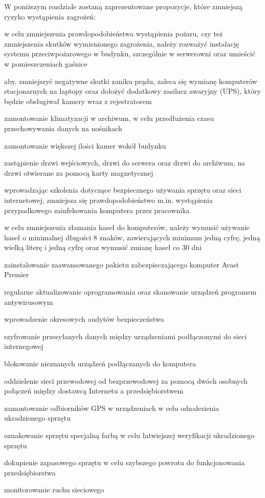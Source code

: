 W poniższym rozdziale zostaną zaprezentowane propozycje, które zmniejszą ryzyko wystąpienia zagrożeń:
\begin{itemize*}
	\item w celu zmniejszenia prawdopodobieństwa wystąpienia pożaru, czy też zmniejszenia skutków wymienionego zagrożenia, należy rozważyć instalację systemu przeciwpożarowego w budynku, szczególnie w serwerowni oraz umieścić w pomieszczeniach gaśnice
	\item aby, zmniejszyć negatywne skutki zaniku prądu, zaleca się wymianę komputerów stacjonarnych na laptopy oraz dołożyć dodatkowy zasilacz awaryjny (UPS), który będzie obsługiwał kamery wraz z rejestratorem
	\item zamontowanie klimatyzacji w archiwum, w celu przedłużenia czasu przechowywania danych na nośnikach
	\item zamontowanie większej ilości kamer wokół budynku
	\item zastąpienie drzwi wejściowych, drzwi do serwera oraz drzwi do archiwum, na drzwi otwierane za pomocą karty magnetycznej
	\item wprowadzając szkolenia dotyczące bezpiecznego używania sprzętu oraz sieci internetowej, zmniejsza się prawdopodobieństwo m.in. wystąpienia przypadkowego zainfekowania komputera przez pracownika
	\item w celu zmniejszenia złamania haseł do komputerów, należy wymusić używanie haseł o minimalnej długości 8 znaków, zawierających minimum jedną cyfrę, jedną wielką literę i jedną cyfrę oraz wymusić zmianę haseł co 30 dni
	\item zainstalowanie zaawansowanego pakietu zabezpieczającego komputer Avast Premier
	\item regularne aktualizowanie oprogramowania oraz skanowanie urządzeń programem antywirusowym
	\item wprowadzenie okresowych audytów bezpieczeństwa
	\item szyfrowanie przesyłanych danych między urządzeniami podłączonymi do sieci internegowej
	\item blokowanie nieznanych urządzeń podłączanych do komputera
	\item oddzielenie sieci przewodowej od bezprzewodowej za pomocą dwóch osobnych połączeń między dostawcą Internetu a przedsiębiorstwem
	\item zamontowanie odbiorników GPS w urządzeniach w celu odnalezienia ukradzionego sprzętu
	\item oznakowanie sprzętu specjalną farbą w celu łatwiejszej weryfikacji ukradzionego sprzętu
	\item dokupienie zapasowego sprzętu w celu szybszego powrotu do funkcjonowania przedsiębiorstwa  
	\item monitorowanie ruchu sieciowego
\end{itemize*}
